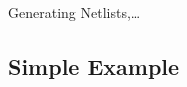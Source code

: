 \documentclass[9pt,final,a4paper,leqno]{article}
\begin{document}
%
%
%
%
%
%
%
%
%
%
%
%
%


Generating Netlists,\ldots

\subsection{Simple Example}
\end{document}
